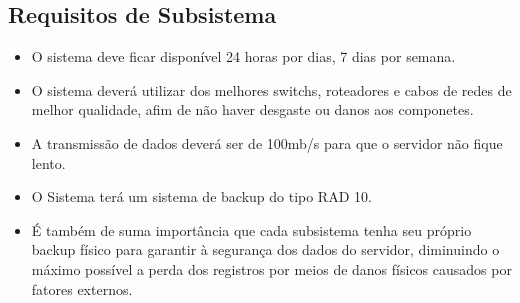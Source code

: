      \subsection{Requisitos de Subsistema}
      \begin{itemize}
       \item  O sistema deve ficar disponível 24 horas por dias, 7 dias por semana.
       \item  O sistema deverá utilizar dos melhores switchs, roteadores e cabos de redes de melhor qualidade, afim de não haver desgaste ou danos aos componetes.
       \item  A transmissão de dados deverá ser de 100mb/s para que o servidor não fique lento.
       \item O Sistema terá um sistema de backup do tipo RAD 10.
       \item É também de suma importância que cada subsistema tenha seu próprio backup físico para garantir à segurança dos dados do servidor, diminuindo o máximo possível a perda dos registros por meios de danos físicos causados por fatores externos.
      \end{itemize}


